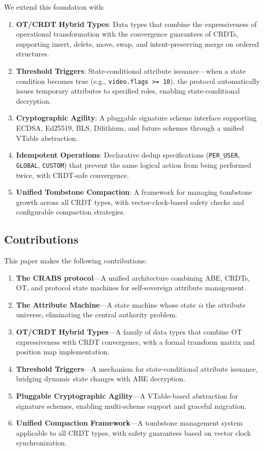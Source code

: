 \documentclass[11pt,a4paper]{article}
\begin{document}
We extend this foundation with:

\begin{enumerate}[leftmargin=*,label={\arabic*.}]
    \item \textbf{OT/CRDT Hybrid Types}: Data types that combine the expressiveness of operational transformation with the convergence guarantees of CRDTs, supporting insert, delete, move, swap, and intent-preserving merge on ordered structures.
    \item \textbf{Threshold Triggers}: State-conditional attribute issuance---when a state condition becomes true (e.g., \texttt{video.flags >= 10}), the protocol automatically issues temporary attributes to specified roles, enabling state-conditional decryption.
    \item \textbf{Cryptographic Agility}: A pluggable signature scheme interface supporting ECDSA, Ed25519, BLS, Dilithium, and future schemes through a unified VTable abstraction.
    \item \textbf{Idempotent Operations}: Declarative dedup specifications (\texttt{PER\_USER}, \texttt{GLOBAL}, \texttt{CUSTOM}) that prevent the same logical action from being performed twice, with CRDT-safe convergence.
    \item \textbf{Unified Tombstone Compaction}: A framework for managing tombstone growth across all CRDT types, with vector-clock-based safety checks and configurable compaction strategies.
\end{enumerate}

\subsection{Contributions}

This paper makes the following contributions:

\begin{enumerate}[leftmargin=*,label={\arabic*.}]
    \item \textbf{The CRABS protocol}---A unified architecture combining ABE, CRDTs, OT, and protocol state machines for self-sovereign attribute management.
    \item \textbf{The Attribute Machine}---A state machine whose state \textit{is} the attribute universe, eliminating the central authority problem.
    \item \textbf{OT/CRDT Hybrid Types}---A family of data types that combine OT expressiveness with CRDT convergence, with a formal transform matrix and position map implementation.
    \item \textbf{Threshold Triggers}---A mechanism for state-conditional attribute issuance, bridging dynamic state changes with ABE decryption.
    \item \textbf{Pluggable Cryptographic Agility}---A VTable-based abstraction for signature schemes, enabling multi-scheme support and graceful migration.
    \item \textbf{Unified Compaction Framework}---A tombstone management system applicable to all CRDT types, with safety guarantees based on vector clock synchronization.
\end{enumerate}
\end{document}
